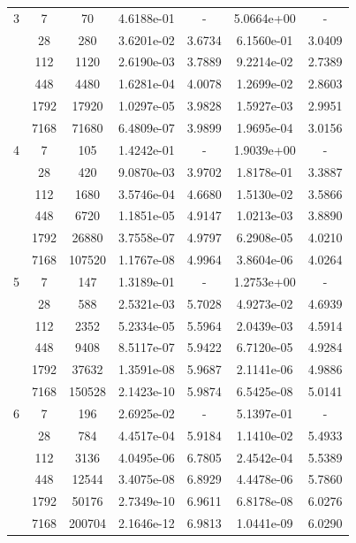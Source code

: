 \begin{longtable}{| c | c c | c c | c c |}
	\hline

	3	& 7 & 70 & 4.6188e-01 & - & 5.0664e+00 & - \\
		& 28 & 280 & 3.6201e-02 & 3.6734 & 6.1560e-01 & 3.0409 \\
		& 112 & 1120 & 2.6190e-03 & 3.7889 & 9.2214e-02 & 2.7389 \\
		& 448 & 4480 & 1.6281e-04 & 4.0078 & 1.2699e-02 & 2.8603 \\
		& 1792 & 17920 & 1.0297e-05 & 3.9828 & 1.5927e-03 & 2.9951 \\
		& 7168 & 71680 & 6.4809e-07 & 3.9899 & 1.9695e-04 & 3.0156 \\

	\hline

	4	& 7 & 105 & 1.4242e-01 & - & 1.9039e+00 & - \\
		& 28 & 420 & 9.0870e-03 & 3.9702 & 1.8178e-01 & 3.3887 \\
		& 112 & 1680 & 3.5746e-04 & 4.6680 & 1.5130e-02 & 3.5866 \\
		& 448 & 6720 & 1.1851e-05 & 4.9147 & 1.0213e-03 & 3.8890 \\
		& 1792 & 26880 & 3.7558e-07 & 4.9797 & 6.2908e-05 & 4.0210 \\
		& 7168 & 107520 & 1.1767e-08 & 4.9964 & 3.8604e-06 & 4.0264 \\

	\hline

	5	& 7 & 147 & 1.3189e-01 & - & 1.2753e+00 & - \\
		& 28 & 588 & 2.5321e-03 & 5.7028 & 4.9273e-02 & 4.6939 \\
		& 112 & 2352 & 5.2334e-05 & 5.5964 & 2.0439e-03 & 4.5914 \\
		& 448 & 9408 & 8.5117e-07 & 5.9422 & 6.7120e-05 & 4.9284 \\
		& 1792 & 37632 & 1.3591e-08 & 5.9687 & 2.1141e-06 & 4.9886 \\
		& 7168 & 150528 & 2.1423e-10 & 5.9874 & 6.5425e-08 & 5.0141 \\
	
	\hline

	6	& 7 & 196 & 2.6925e-02 & - & 5.1397e-01 & - \\
		& 28 & 784 & 4.4517e-04 & 5.9184 & 1.1410e-02 & 5.4933 \\
		& 112 & 3136 & 4.0495e-06 & 6.7805 & 2.4542e-04 & 5.5389 \\
		& 448 & 12544 & 3.4075e-08 & 6.8929 & 4.4478e-06 & 5.7860 \\
		& 1792 & 50176 & 2.7349e-10 & 6.9611 & 6.8178e-08 & 6.0276 \\
		& 7168 & 200704 & 2.1646e-12 & 6.9813 & 1.0441e-09 & 6.0290 \\


\end{longtable}
